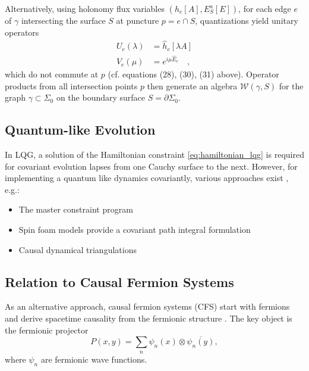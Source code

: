 \documentclass[11pt,a4paper]{article}
\theoremstyle{definition}
\begin{document}
	Alternatively, using holonomy flux variables $(h_e[A], E_S^a[E] )$, for each edge $e$ of $\gamma$ intersecting the surface $S$ at puncture $p=e\cap S$, quantizations yield unitary operators
	\begin{align}
		U_e(\lambda) &= \hat{h}_e[\lambda A] \\
		V_e(\mu) &= e^{i\mu \hat{E}_e}  \quad ,
	\end{align}
	which do not commute at $p$ (cf. equations (28), (30), (31) above).
	Operator products from all intersection points $p$ then generate 
	an algebra $\mathcal{W}(\gamma, S)$ for the graph $\gamma\subset \Sigma_0$ on the boundary surface $S=\partial \Sigma_0$. 
	
	
	
	\subsection{Quantum-like Evolution}
	
	In LQG, a solution of the Hamiltonian constraint \eqref{eq:hamiltonian_lqg} is required for covariant evolution lapses from one Cauchy surface to the next.
	However, for implementing a quantum like dynamics covariantly,
	various approaches exist , e.g.:
	\begin{itemize}
		\item The master constraint program \cite{thiemann2007}
		\item Spin foam models provide a covariant path integral formulation \cite{perez2013}
		\item Causal dynamical triangulations \cite{ambjorn2012}
	\end{itemize}
	
	\subsection{Relation to Causal Fermion Systems}
	
	As an alternative approach, causal fermion systems (CFS) start with fermions and derive spacetime causality from the fermionic structure \cite{finster2016,finster2020}. The key object is the fermionic projector
	\begin{equation}
		P(x,y) = \sum_n \psi_n(x) \otimes \overline{\psi_n(y)} ,
	\end{equation}
	where $\psi_n$ are fermionic wave functions.
	
\end{document}

